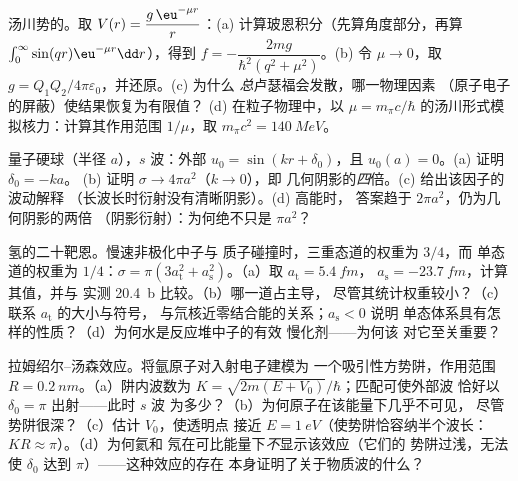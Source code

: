 \begin{exercise}[$\star\star$]\label{exo:b3:scattering-theory:5}
汤川势的。取 $V(r) = \dfrac{g\,\eu^{-\mu r}}{r}$：(a)
计算玻恩积分（先算角度部分，再算 $\int_0^
\infty\sin(qr)\eu^{-\mu r}\dd r$），得到 $f = -\dfrac{2mg}
{\hbar^2(q^2 + \mu^2)}$。(b) 令 $\mu \to 0$，取 $g =
Q_1Q_2/4\pi\varepsilon_0$，并还原。(c) 为什么
\emph{总}卢瑟福会发散，哪一物理因素
（原子电子的屏蔽）使结果恢复为有限值？
(d) 在粒子物理中，以 $\mu =
m_\pi c/\hbar$ 的汤川形式模拟核力：计算其作用范围
$1/\mu$，取 $m_\pi c^2 = \qty{140}{MeV}$。
\end{exercise}

\begin{exercise}[$\star\star$]\label{exo:b3:scattering-theory:6}
量子硬球（半径 $a$），$s$ 波：外部 $u_0 =
\sin(kr + \delta_0)$，且 $u_0(a) = 0$。(a) 证明 $\delta_0 = -ka$。
(b) 证明 $\sigma \to 4\pi a^2$（$k \to 0$），即
几何阴影的\emph{四}倍。(c) 给出该因子的波动解释
（长波长时衍射没有清晰阴影）。(d) 高能时，
答案趋于 $2\pi a^2$，仍为几何阴影的两倍
（阴影衍射）：为何绝不只是 $\pi a^2$？
\end{exercise}

\begin{exercise}[$\star\star$]\label{exo:b3:scattering-theory:7}
氢的二十靶恩。慢速非极化中子与
质子碰撞时，三重态道的权重为 $3/4$，而
单态道的权重为 $1/4$：$\sigma = \pi(3a_{\text{t}}^2 +
a_{\text{s}}^2)$。（a）取 $a_{\text{t}} = \qty{5.4}{fm}$，
$a_{\text{s}} = \qty{-23.7}{fm}$，计算其值，并与
实测 \qty{20.4}{b} 比较。（b）哪一道占主导，
尽管其统计权重较小？（c）联系 $a_{\text{t}}$ 的大小与符号，
与氘核近零结合能的关系；$a_{\text{s}} < 0$ 说明
单态体系具有怎样的性质？（d）为何水是反应堆中子的有效
慢化剂——为何该
对它至关重要？
\end{exercise}

\begin{exercise}[$\star\star$]\label{exo:b3:scattering-theory:8}
拉姆绍尔–汤森效应。将氩原子对入射电子建模为
一个吸引性方势阱，作用范围 $R =
\qty{0.2}{nm}$。（a）阱内波数为 $K =
\sqrt{2m(E + V_0)}/\hbar$；匹配可使外部波
恰好以 $\delta_0 = \pi$ 出射——此时 $s$ 波
为多少？（b）为何原子在该能量下几乎不可见，
尽管势阱很深？（c）估计 $V_0$，使透明点
接近 $E = \qty{1}{eV}$（使势阱恰容纳半个波长：
$KR \approx \pi$）。（d）为何氦和
氖在可比能量下\emph{不}显示该效应（它们的
势阱过浅，无法使 $\delta_0$ 达到 $\pi$）——这种效应的存在
本身证明了关于物质波的什么？
\end{exercise}

